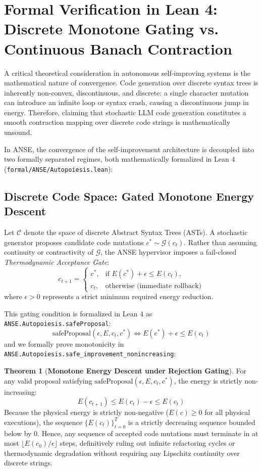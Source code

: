\documentclass[10pt,journal,compsoc,twocolumn]{IEEEtran}
\theoremstyle{definition}
\newtheorem{theorem}{Theorem}
\begin{document}
\section{Formal Verification in Lean 4: Discrete Monotone Gating vs. Continuous Banach Contraction}
A critical theoretical consideration in autonomous self-improving systems is the mathematical nature of convergence. Code generation over discrete syntax trees is inherently non-convex, discontinuous, and discrete: a single character mutation can introduce an infinite loop or syntax crash, causing a discontinuous jump in energy. Therefore, claiming that stochastic LLM code generation constitutes a smooth contraction mapping over discrete code strings is mathematically unsound.

In ANSE, the convergence of the self-improvement architecture is decoupled into two formally separated regimes, both mathematically formalized in Lean 4 (\texttt{formal/ANSE/Autopoiesis.lean}):

\subsection{Discrete Code Space: Gated Monotone Energy Descent}
Let $\mathcal{C}$ denote the space of discrete Abstract Syntax Trees (ASTs). A stochastic generator proposes candidate code mutations $c^* \sim \mathcal{G}(c_t)$. Rather than assuming continuity or contractivity of $\mathcal{G}$, the ANSE hypervisor imposes a fail-closed \textit{Thermodynamic Acceptance Gate}:
\begin{equation}
c_{t+1} = 
\begin{cases}
c^*, & \text{if } E(c^*) + \epsilon \le E(c_t), \\
c_t, & \text{otherwise (immediate rollback)}
\end{cases}
\label{eq:rejection_gate}
\end{equation}
where $\epsilon > 0$ represents a strict minimum required energy reduction.

This gating condition is formalized in Lean 4 as \texttt{ANSE.Autopoiesis.safeProposal}:
\begin{equation}
\text{safeProposal}(\epsilon, E, c_t, c^*) \iff E(c^*) + \epsilon \le E(c_t)
\end{equation}
and we formally prove monotonicity in \texttt{ANSE.Autopoiesis.safe\_improvement\_nonincreasing}:
\begin{theorem}[\textbf{Monotone Energy Descent under Rejection Gating}]
For any valid proposal satisfying $\text{safeProposal}(\epsilon, E, c_t, c^*)$, the energy is strictly non-increasing:
\begin{equation}
E(c_{t+1}) \le E(c_t) - \epsilon \le E(c_t)
\end{equation}
Because the physical energy is strictly non-negative ($E(c) \ge 0$ for all physical executions), the sequence $\{E(c_t)\}_{t=0}^T$ is a strictly decreasing sequence bounded below by $0$. Hence, any sequence of accepted code mutations must terminate in at most $\lfloor E(c_0) / \epsilon \rfloor$ steps, definitively ruling out infinite refactoring cycles or thermodynamic degradation without requiring any Lipschitz continuity over discrete strings.
\end{theorem}
\end{document}
